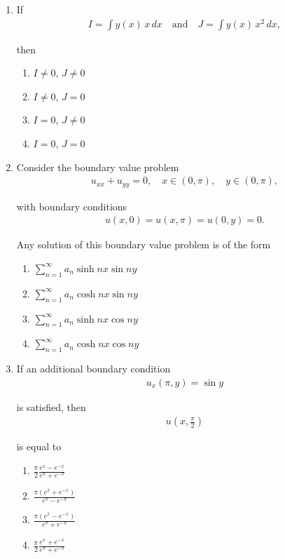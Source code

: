 \documentclass[journal]{IEEEtran}
\numberwithin{equation}{enumi}
\numberwithin{figure}{enumi}
\begin{document}
\begin{enumerate}
\item
If
\begin{align}
    I = \int y(x) \, x \, dx \quad \text{and} \quad J = \int y(x) \, x^2 \, dx,
\end{align}

then
\hfill{}
\begin{multicols}{2}
\begin{enumerate}
    \item $I \neq 0$, $J \neq 0$
    \item $I \neq 0$, $J = 0$
    \item $I = 0$, $J \neq 0$
    \item $I = 0$, $J = 0$
\end{enumerate}
\end{multicols}

\item
Consider the boundary value problem
\begin{align}
    u_{xx} + u_{yy} = 0, \quad x \in (0,\pi), \quad y \in (0,\pi),
\end{align}

with boundary conditions
\begin{align}
    u(x, 0) = u(x, \pi) = u(0, y) = 0.
\end{align}

Any solution of this boundary value problem is of the form
\hfill{}
\begin{multicols}{2}
\begin{enumerate}
    \item $\sum_{n=1}^\infty a_n \sinh nx \sin ny$
    \item $\sum_{n=1}^\infty a_n \cosh nx \sin ny$
    \item $\sum_{n=1}^\infty a_n \sinh nx \cos ny$
    \item $\sum_{n=1}^\infty a_n \cosh nx \cos ny$
\end{enumerate}
\end{multicols}

\item
If an additional boundary condition
\begin{align}
    u_x(\pi, y) = \sin y
\end{align}

is satisfied, then 
\begin{align}
    u\left(x, \frac{\pi}{2}\right)
\end{align}

is equal to
\hfill{}
\begin{multicols}{4}
\begin{enumerate}
    \item $\frac{\pi}{2} \frac{e^x - e^{-x}}{e^\pi + e^{-\pi}}$
    \item $\frac{\pi (e^x + e^{-x})}{e^\pi - e^{-\pi}}$
    \item $\frac{\pi (e^x - e^{-x})}{e^\pi + e^{-\pi}}$
    \item $\frac{\pi}{2} \frac{e^x + e^{-x}}{e^\pi + e^{-\pi}}$
\end{enumerate}
\end{multicols}


\end{enumerate}
\end{document}
